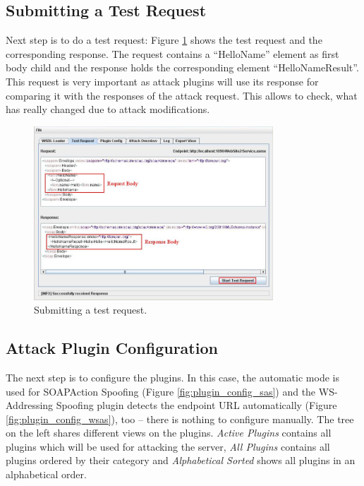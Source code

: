 \subsection{Submitting a Test Request}
\label{sec:submitting_a_test_request}

Next step is to do a test request: Figure \ref{fig:test_request} shows
the test request and the corresponding response. The request contains a
\enquote{HelloName} element as first body child and the response holds the
corresponding element \enquote{HelloNameResult}. This request is very important
as attack plugins will use its response for comparing it with the responses of
the attack request. This allows to check, what has really changed due to attack
modifications. 

\begin{figure}[h!]
    \begin{center}
        \includegraphics[width=0.8\textwidth]{img/test_request}
    \end{center}
    \caption{Submitting a test request.}
    \label{fig:test_request}
\end{figure}

\subsection{Attack Plugin Configuration}
\label{sec:attack_plugin_configuration}

The next step is to configure the plugins. In this case, the automatic mode is
used for SOAPAction Spoofing (Figure \ref{fig:plugin_config_sas}) and
the WS-Addressing Spoofing plugin detects the endpoint URL automatically
(Figure \ref{fig:plugin_config_wsas}), too -- there is nothing to
configure manually. The tree on the left shares different views on the plugins.
\emph{Active Plugins} contains all plugins which will be used for attacking the
server, \emph{All Plugins} contains all plugins ordered by their category and
\emph{Alphabetical Sorted} shows all plugins in an alphabetical order.

